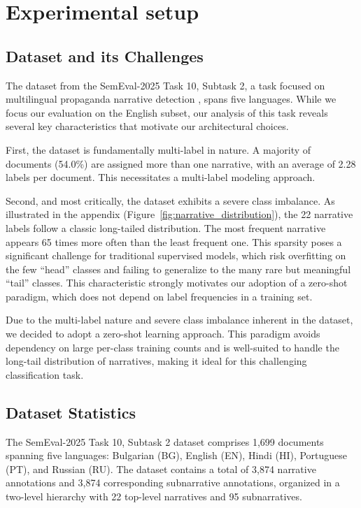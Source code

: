 \section{Experimental setup}

\subsection{Dataset and its Challenges}

The dataset from the SemEval-2025 Task 10, Subtask 2, a task focused on multilingual propaganda narrative detection \cite{semeval2025task10}, spans five languages. While we focus our evaluation on the English subset, our analysis of this task reveals several key characteristics that motivate our architectural choices.

First, the dataset is fundamentally multi-label in nature. A majority of documents (54.0\%) are assigned more than one narrative, with an average of 2.28 labels per document. This necessitates a multi-label modeling approach.

Second, and most critically, the dataset exhibits a severe class imbalance. As illustrated in the appendix (Figure~\ref{fig:narrative_distribution}), the 22 narrative labels follow a classic long-tailed distribution. The most frequent narrative appears 65 times more often than the least frequent one. This sparsity poses a significant challenge for traditional supervised models, which risk overfitting on the few ``head'' classes and failing to generalize to the many rare but meaningful ``tail'' classes. This characteristic strongly motivates our adoption of a zero-shot paradigm, which does not depend on label frequencies in a training set.

Due to the multi-label nature and severe class imbalance inherent in the dataset, we decided to adopt a zero-shot learning approach. This paradigm avoids dependency on large per-class training counts and is well-suited to handle the long-tail distribution of narratives, making it ideal for this challenging classification task.

\subsection{Dataset Statistics}

The SemEval-2025 Task 10, Subtask 2 dataset comprises 1,699 documents spanning five languages: Bulgarian (BG), English (EN), Hindi (HI), Portuguese (PT), and Russian (RU). The dataset contains a total of 3,874 narrative annotations and 3,874 corresponding subnarrative annotations, organized in a two-level hierarchy with 22 top-level narratives and 95 subnarratives.

